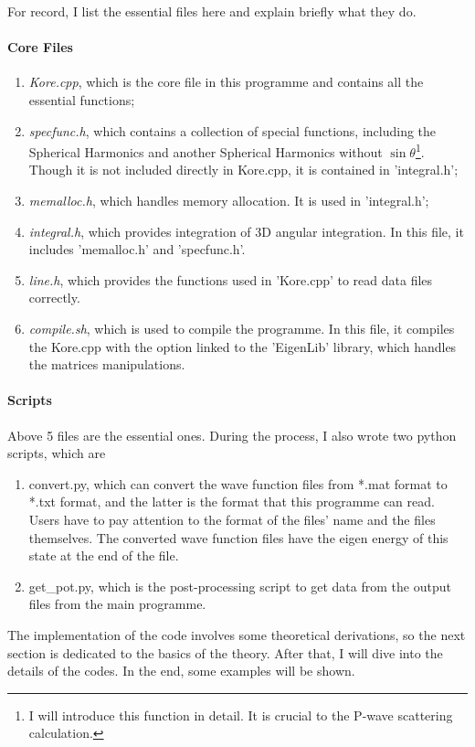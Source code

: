 \documentclass[british,english]{article}
\numberwithin{equation}{section}
\numberwithin{figure}{section}
\begin{document}
For record, I list the essential files here and explain briefly what
they do. 

\paragraph{Core Files}
\begin{enumerate}
\item \emph{Kore.cpp}, which is the core file in this programme and contains
all the essential functions;
\item \emph{specfunc.h}, which contains a collection of special functions,
including the Spherical Harmonics and another Spherical Harmonics
without $\sin\theta$\footnote{I will introduce this function in detail. It is crucial to the P-wave
scattering calculation.}. Though it is not included directly in Kore.cpp, it is contained
in 'integral.h';
\item \emph{memalloc.h}, which handles memory allocation. It is used in
'integral.h';
\item \emph{integral.h}, which provides integration of 3D angular integration.
In this file, it includes 'memalloc.h' and 'specfunc.h'. 
\item \emph{line.h}, which provides the functions used in 'Kore.cpp' to
read data files correctly.
\item \emph{compile.sh}, which is used to compile the programme. In this
file, it compiles the Kore.cpp with the option linked to the 'EigenLib'
library, which handles the matrices manipulations.
\end{enumerate}
%

\paragraph{Scripts\label{subsec:Scripts}}

Above 5 files are the essential ones. During the process, I also wrote
two python scripts, which are 
\begin{enumerate}
\item convert.py, which can convert the wave function files from {*}.mat
format to {*}.txt format, and the latter is the format that this programme
can read. Users have to pay attention to the format of the files'
name and the files themselves. The converted wave function files have
the eigen energy of this state at the end of the file.
\item get\_pot.py, which is the post-processing script to get data from
the output files from the main programme.
\end{enumerate}
%
The implementation of the code involves some theoretical derivations,
so the next section is dedicated to the basics of the theory. After
that, I will dive into the details of the codes. In the end, some
examples will be shown.
\end{document}
